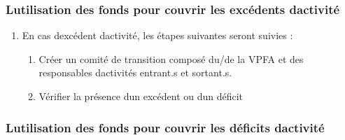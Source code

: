 \subsubsection{L\textquotesingle utilisation des fonds pour couvrir les excédents d\textquotesingle activité}
\label{l-utilisation-des-fonds-pour-couvrir-les-excedents-d-activite}

\begin{enumerate}
 \item
  En cas d\textquotesingle excédent d\textquotesingle activité, les étapes suivantes seront suivies :

  \begin{enumerate}
   \item
    Créer un comité de transition composé du/de la VPFA et des responsables d\textquotesingle activités entrant.s et sortant.s.
   \item
    Vérifier la présence d\textquotesingle un excédent ou d\textquotesingle un déficit
  \end{enumerate}
\end{enumerate}

\subsubsection{L\textquotesingle utilisation des fonds pour couvrir les déficits d\textquotesingle activité}
\label{l-utilisation-des-fonds-pour-couvrir-les-deficits-d-activite}

